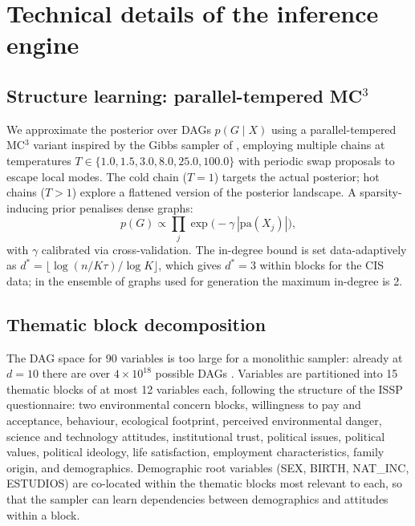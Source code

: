 \section{Technical details of the inference engine}
\label{app:technical}

\subsection{Structure learning: parallel-tempered MC$^3$}

We approximate the posterior over DAGs $p(G \mid X)$ using a parallel-tempered MC$^3$
variant \citep{geyer1991} inspired by the Gibbs sampler of \citet{goudie2016}, employing
multiple chains at temperatures $T \in \{1.0, 1.5, 3.0, 8.0, 25.0, 100.0\}$ with periodic
swap proposals to escape local modes. The cold chain ($T=1$) targets the actual posterior;
hot chains ($T>1$) explore a flattened version of the posterior landscape. A
sparsity-inducing prior penalises dense graphs:
\begin{equation}
p(G) \propto \prod_j \exp\!\bigl(-\gamma\,|\mathrm{pa}(X_j)|\bigr),
\end{equation}
with $\gamma$ calibrated via cross-validation. The in-degree bound is set
data-adaptively as $d^* = \lfloor \log(n / K\tau) / \log K \rfloor$, which
gives $d^* = 3$ within blocks for the CIS data; in the ensemble of graphs used
for generation the maximum in-degree is 2.

\subsection{Thematic block decomposition}

The DAG space for 90 variables is too large for a monolithic sampler: already at $d=10$
there are over $4 \times 10^{18}$ possible DAGs \citep{kjaerulff2008}. Variables are
partitioned into 15 thematic blocks of at most 12 variables each, following the structure of
the ISSP questionnaire: two environmental concern blocks, willingness to pay and acceptance,
behaviour, ecological footprint, perceived environmental danger, science and technology
attitudes, institutional trust, political issues, political values, political ideology, life
satisfaction, employment characteristics, family origin, and demographics. Demographic root
variables (SEX, BIRTH, NAT\_INC, ESTUDIOS) are co-located within the thematic blocks most
relevant to each, so that the sampler can learn dependencies between demographics and
attitudes within a block.

